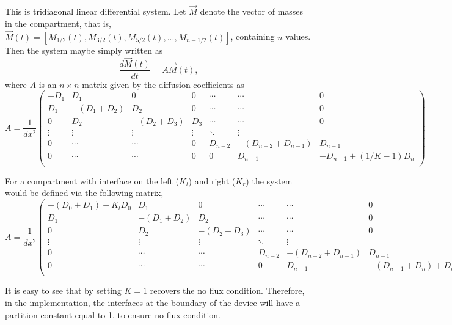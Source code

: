 \documentclass[final,1p,times]{elsarticle}
\begin{document}
This is tridiagonal linear differential system. Let $\vec{M}$ denote the vector of masses in the compartment, that is,
$\vec{M}(t)=[M_{1/2}(t), M_{3/2}(t), M_{5/2}(t), ..., M_{n-1/2}(t)]$, containing $n$ values. Then the system maybe simply written as
\begin{equation}
\frac{d \vec{M}(t)}{dt}=A\vec{M}(t),
\end{equation}
where $A$ is an $n\times n$ matrix given by the diffusion coefficients as
\begin{equation}
A=
\frac{1}{dx^2}
\begin{pmatrix}
-D_1 & D_1 & 0 & 0& \cdots &  \cdots & 0 \\
D_1 & -(D_1+D_2) & D_2 & 0 & \cdots & \cdots & 0 \\
0 & D_2 & -(D_2+D_3) & D_3 & \cdots & \cdots & 0 \\
\vdots  & \vdots & \vdots & \vdots & \ddots & \vdots  \\
0 & \cdots & \cdots& 0 & D_{n-2} & -(D_{n-2}+D_{n-1}) & D_{n-1} \\
0 & \cdots  & \cdots &0 & 0 & D_{n-1} & -D_{n-1}+(1/K-1)D_{n} \\
\end{pmatrix}
\end{equation}

For a compartment with interface on the left ($K_l$) and right ($K_r$) the system would be defined via the following matrix,
\begin{equation}
A=
\frac{1}{dx^2}
\begin{pmatrix}
-(D_0+D_1)+K_lD_0 & D_1  & 0& \cdots &  \cdots & 0 \\
D_1 & -(D_1+D_2) & D_2  & \cdots & \cdots & 0 \\
0 & D_2 & -(D_2+D_3)  & \cdots & \cdots & 0 \\
\vdots  & \vdots & \vdots  & \ddots & \vdots  \\
0 & \cdots & \cdots & D_{n-2} & -(D_{n-2}+D_{n-1}) & D_{n-1} \\
0 & \cdots  & \cdots  & 0 & D_{n-1} & -(D_{n-1}+D_n)+D_n/K_r \\
\end{pmatrix}.
\end{equation}

It is easy to see that by setting $K=1$ recovers the no flux condition. Therefore, in the implementation, the interfaces at the boundary of the device will have a partition constant equal to 1, to ensure no flux condition.
\end{document}
